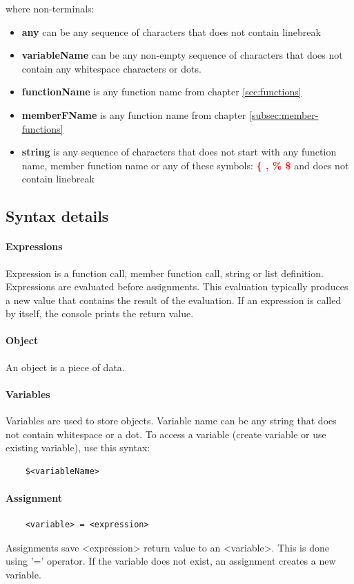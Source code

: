 \documentclass{ctuthesis}
\begin{document}
where non-terminals:
\begin{itemize}
	\item \textbf{any} can be any sequence of characters that does not contain linebreak
	\item \textbf{variableName} can be any non-empty sequence of characters that does not contain any whitespace characters or dots. 
	\item \textbf{functionName} is any function name from chapter \ref{sec:functions}
	\item \textbf{memberFName} is any function name from chapter \ref{subsec:member-functions}
	\item \textbf{string} is any sequence of characters that does not start with any function name, member function name or any of these symbols: \textcolor{red}{\textbf{\{ , \% \$}} and does not contain linebreak
\end{itemize}

\subsection{Syntax details}

\paragraph{Expressions}
Expression is a function call, member function call, string or list definition. Expressions are evaluated before assignments. This evaluation typically produces a new value that contains the result of the evaluation. If an expression is called by itself, the console prints the return value.

\paragraph{Object} 
An object is a piece of data. 

\paragraph{Variables}
Variables are used to store objects. Variable name can be any string that does not contain whitespace or a dot. To access a variable (create variable or use existing variable), use this syntax:
\begin{verbatim}
	$<variableName>
\end{verbatim}

\paragraph{Assignment}
\begin{verbatim}
	<variable> = <expression>
\end{verbatim} 
Assignments save <expression> return value to an <variable>. This is done using '=' operator. If the variable does not exist, an assignment creates a new variable.
\end{document}
